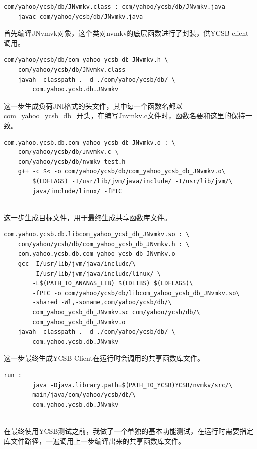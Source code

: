 		\begin{Verbatim}[frame = single]
	com/yahoo/ycsb/db/JNvmkv.class : com/yahoo/ycsb/db/JNvmkv.java
    javac com/yahoo/ycsb/db/JNvmkv.java

		\end{Verbatim}
		首先编译JNvmvk对象，这个类对nvmkv的底层函数进行了封装，供YCSB client调用。


		\begin{Verbatim}[frame = single]
	com/yahoo/ycsb/db/com_yahoo_ycsb_db_JNvmkv.h \ 
	com/yahoo/ycsb/db/JNvmkv.class
    javah -classpath . -d ./com/yahoo/ycsb/db/ \ 
        com.yahoo.ycsb.db.JNvmkv

		\end{Verbatim}
		这一步生成负荷JNI格式的头文件，其中每一个函数名都以com\_yahoo\_ycsb\_db\_开头，在编写Jnvmkv.c文件时，函数名要和这里的保持一致。



		\begin{Verbatim}[frame = single]
com.yahoo.ycsb.db.com_yahoo_ycsb_db_JNvmkv.o : \ 
	com/yahoo/ycsb/db/JNvmkv.c \ 
	com/yahoo/ycsb/db/nvmkv-test.h
    g++ -c $< -o com/yahoo/ycsb/db/com_yahoo_ycsb_db_JNvmkv.o\ 
        $(LDFLAGS) -I/usr/lib/jvm/java/include/ -I/usr/lib/jvm/\ 
        java/include/linux/ -fPIC
		
		\end{Verbatim}
		这一步生成目标文件，用于最终生成共享函数库文件。


		\begin{Verbatim}[frame = single]
com.yahoo.ycsb.db.libcom_yahoo_ycsb_db_JNvmkv.so : \ 
	com/yahoo/ycsb/db/com_yahoo_ycsb_db_JNvmkv.h : \
	com.yahoo.ycsb.db.com_yahoo_ycsb_db_JNvmkv.o
    gcc -I/usr/lib/jvm/java/include/\
        -I/usr/lib/jvm/java/include/linux/ \
        -L$(PATH_TO_ANANAS_LIB) $(LDLIBS) $(LDFLAGS)\
        -fPIC -o com/yahoo/ycsb/db/libcom_yahoo_ycsb_db_JNvmkv.so\ 
        -shared -Wl,-soname,com/yahoo/ycsb/db/\
        com_yahoo_ycsb_db_JNvmkv.so com/yahoo/ycsb/db/\
        com_yahoo_ycsb_db_JNvmkv.o
    javah -classpath . -d ./com/yahoo/ycsb/db/ \ 
        com.yahoo.ycsb.db.JNvmkv

		\end{Verbatim}
		这一步最终生成YCSB Client在运行时会调用的共享函数库文件。

		\begin{Verbatim}[frame = single]
run :
        java -Djava.library.path=$(PATH_TO_YCSB)YCSB/nvmkv/src/\
        main/java/com/yahoo/ycsb/db/\
        com.yahoo.ycsb.db.JNvmkv
		
		\end{Verbatim}
		在最终使用YCSB测试之前，我做了一个单独的基本功能测试，在运行时需要指定库文件路径，一遍调用上一步编译出来的共享函数库文件。

